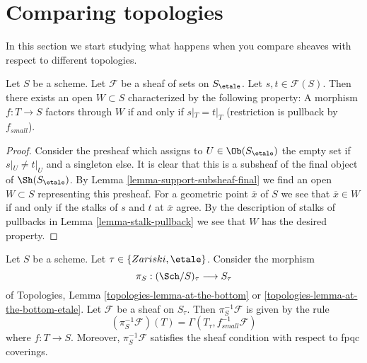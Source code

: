 \section{Comparing topologies}
\label{section-compare-topologies}

\noindent
In this section we start studying what happens when you compare
sheaves with respect to different topologies.

\begin{lemma}
\label{lemma-where-sections-are-equal}
Let $S$ be a scheme. Let $\mathcal{F}$ be a sheaf of sets on $S_\etale$.
Let $s, t \in \mathcal{F}(S)$. Then there exists an open $W \subset S$
characterized by the following property: A morphism $f : T \to S$
factors through $W$ if and only if $s|_T = t|_T$ (restriction is
pullback by $f_{small}$).
\end{lemma}

\begin{proof}
Consider the presheaf which assigns to $U \in \Ob(S_\etale)$ the empty set
if $s|_U \not = t|_U$ and a singleton else. It is clear that this is
a subsheaf of the final object of $\Sh(S_\etale)$. By
Lemma \ref{lemma-support-subsheaf-final}
we find an open $W \subset S$ representing this presheaf.
For a geometric point $\overline{x}$ of $S$ we see that $\overline{x} \in W$
if and only if the stalks of $s$ and $t$ at $\overline{x}$ agree.
By the description of stalks of pullbacks in
Lemma \ref{lemma-stalk-pullback}
we see that $W$ has the desired property.
\end{proof}

\begin{lemma}
\label{lemma-describe-pullback}
Let $S$ be a scheme. Let $\tau \in \{Zariski, \etale\}$. Consider the morphism
$$
\pi_S : (\Sch/S)_\tau \longrightarrow S_\tau
$$
of Topologies, Lemma \ref{topologies-lemma-at-the-bottom} or
\ref{topologies-lemma-at-the-bottom-etale}. Let $\mathcal{F}$ be a sheaf on
$S_\tau$. Then $\pi_S^{-1}\mathcal{F}$ is given by the rule
$$
(\pi_S^{-1}\mathcal{F})(T) = \Gamma(T_\tau, f_{small}^{-1}\mathcal{F})
$$
where $f : T \to S$. Moreover, $\pi_S^{-1}\mathcal{F}$ satisfies the
sheaf condition with respect to fpqc coverings.
\end{lemma}

